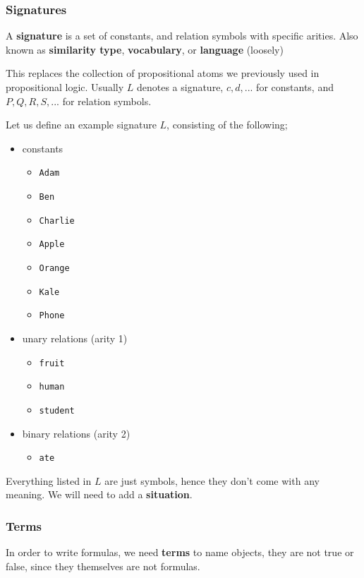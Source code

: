 \documentclass[a4paper, 12pt]{article}
\begin{document}
        \subsubsection*{Signatures}
        A \textbf{signature} is a set of constants, and relation symbols with specific arities. Also known as \textbf{similarity type}, \textbf{vocabulary}, or \textbf{language} (loosely)
        \medskip

        This replaces the collection of propositional atoms we previously used in propositional logic. Usually $L$ denotes a signature, $c, d, ...$ for constants, and $P, Q, R, S, ...$ for relation symbols.
        \medskip

        Let us define an example signature $L$, consisting of the following;
        \begin{itemize}
            \item constants
                \begin{itemize}
                    \item \texttt{Adam}
                    \item \texttt{Ben}
                    \item \texttt{Charlie}
                    \item \texttt{Apple}
                    \item \texttt{Orange}
                    \item \texttt{Kale}
                    \item \texttt{Phone}
                \end{itemize}
            \item unary relations (arity 1)
                \begin{itemize}
                    \item \texttt{fruit}
                    \item \texttt{human}
                    \item \texttt{student}
                \end{itemize}
            \item binary relations (arity 2)
                \begin{itemize}
                    \item \texttt{ate}
                \end{itemize}
        \end{itemize}
        Everything listed in $L$ are just symbols, hence they don't come with any meaning. We will need to add a \textbf{situation}.
        \subsubsection*{Terms}
        In order to write formulas, we need \textbf{terms} to name objects, they are not true or false, since they themselves are not formulas.
        \medskip
\end{document}
